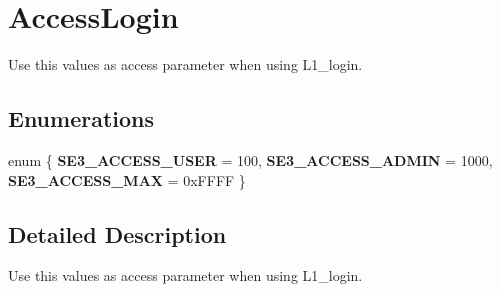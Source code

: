 \hypertarget{group___access_login}{\section{Access\-Login}
\label{group___access_login}
}


Use this values as access parameter when using L1\-\_\-login.  


\subsection*{Enumerations}
\begin{DoxyCompactItemize}
\item 
enum \{ {\bfseries S\-E3\-\_\-\-A\-C\-C\-E\-S\-S\-\_\-\-U\-S\-E\-R} = 100, 
{\bfseries S\-E3\-\_\-\-A\-C\-C\-E\-S\-S\-\_\-\-A\-D\-M\-I\-N} = 1000, 
{\bfseries S\-E3\-\_\-\-A\-C\-C\-E\-S\-S\-\_\-\-M\-A\-X} = 0x\-F\-F\-F\-F
 \}
\end{DoxyCompactItemize}


\subsection{Detailed Description}
Use this values as access parameter when using L1\-\_\-login. 